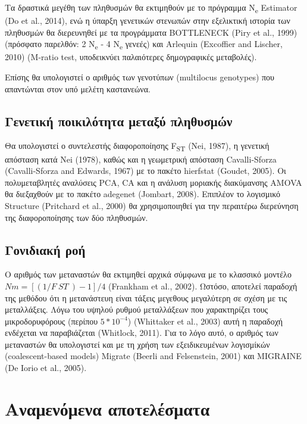 \documentclass[12pt,a4paper,]{report}
\begin{document}
Τα δραστικά μεγέθη των πληθυσμών θα εκτιμηθούν με το πρόγραμμα
N\textsubscript{e} Estimator (Do et al., 2014), ενώ η ύπαρξη γενετικών
στενωπών στην εξελικτική ιστορία των πληθυσμών θα διερευνηθεί με τα
προγράμματα BOTTLENECK (Piry et al., 1999) (πρόσφατο παρελθόν: 2
N\textsubscript{e} - 4 N\textsubscript{e} γενεές) και Arlequin
(Excoffier and Lischer, 2010) (M-ratio test, υποδεικνύει παλαιότερες
δημογραφικές μεταβολές).

Επίσης θα υπολογιστεί ο αριθμός των γενοτύπων (multilocus genotypes) που
απαντώνται στον υπό μελέτη καστανεώνα.

\hypertarget{---}{%
\subsection{Γενετική ποικιλότητα μεταξύ πληθυσμών}\label{---}}

Θα υπολογιστεί ο συντελεστής διαφοροποίησης F\textsubscript{ST} (Nei,
1987), η γενετική απόσταση κατά Nei (1978), καθώς και η γεωμετρική
απόσταση Cavalli-Sforza (Cavalli-Sforza and Edwards, 1967) με το πακέτο
hierfstat (Goudet, 2005). Οι πολυμεταβλητές αναλύσεις PCA, CA και η
ανάλυση μοριακής διακύμανσης AMOVA θα διεξαχθούν με το πακέτο adegenet
(Jombart, 2008). Επιπλέον το λογισμικό Structure (Pritchard et al.,
2000) θα χρησιμοποιηθεί για την περαιτέρω διερεύνηση της διαφοροποίησης
των δύο πληθυσμών.

\hypertarget{-}{%
\subsection{Γονιδιακή ροή}\label{-}}

Ο αριθμός των μεταναστών θα εκτιμηθεί αρχικά σύμφωνα με το κλασσικό
μοντέλο \(Nm = [(1 / F~ST~) - 1] / 4\) (Frankham et al., 2002). Ωστόσο,
αποτελεί παραδοχή της μεθόδου ότι η μετανάστευη είναι τάξεις μεγεθους
μεγαλύτερη σε σχέση με τις μεταλλάξεις. Λόγω του υψηλού ρυθμού
μεταλλάξεων που χαρακτηρίζει τους μικροδορυφόρους (περίπου
\(5 * 10^{-4}\)) (Whittaker et al., 2003) αυτή η παραδοχή ενδέχεται να
παραβιάζεται (Whitlock, 2011). Για το λόγο αυτό, ο αριθμός των
μεταναστών θα υπολογιστεί και με τη χρήση των εξειδικευμένων λογισμίκών
(coalescent-based models) Migrate (Beerli and Felsenstein, 2001) και
MIGRAINE (De Iorio et al., 2005).

\hypertarget{-}{%
\section{Αναμενόμενα αποτελέσματα}\label{-}}
\end{document}
